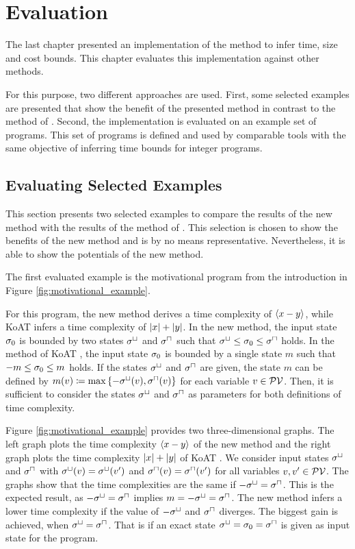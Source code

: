 \chapter{Evaluation}

The last chapter presented an implementation of the method to infer time, size and cost bounds.
This chapter evaluates this implementation against other methods.

For this purpose, two different approaches are used.
First, some selected examples are presented that show the benefit of the presented method in contrast to the method of \cite{koat}.
Second, the implementation is evaluated on an example set of programs.
This set of programs is defined and used by comparable tools with the same objective of inferring time bounds for integer programs.

\section{Evaluating Selected Examples}

This section presents two selected examples to compare the results of the new method with the results of the method of \cite{koat}.
This selection is chosen to show the benefits of the new method and is by no means representative.
Nevertheless, it is able to show the potentials of the new method.

The first evaluated example is the motivational program from the introduction in Figure \ref{fig:motivational_example}.



For this program, the new method derives a time complexity of $\left\langle x-y \right\rangle$, while KoAT \cite{koat} infers a time complexity of $\left|x\right|+\left|y\right|$.
In the new method, the input state $\sigma_0$ is bounded by two states ${\sigma^\sqcup}$ and ${\sigma^\sqcap}$ such that ${\sigma^\sqcup} \leq \sigma_0 \leq {\sigma^\sqcap}$ holds.
In the method of KoAT \cite{koat}, the input state $\sigma_0$ is bounded by a single state $m$ such that $-m \leq \sigma_0 \leq m$ holds.
If the states ${\sigma^\sqcup}$ and ${\sigma^\sqcap}$ are given, the state $m$ can be defined by $m(v) \coloneqq \max \left\lbrace -{\sigma^\sqcup}(v),{\sigma^\sqcap}(v) \right\rbrace$ for each variable $v \in \mathcal{PV}$.
Then, it is sufficient to consider the states ${\sigma^\sqcup}$ and ${\sigma^\sqcap}$ as parameters for both definitions of time complexity.

Figure \ref{fig:motivational_example} provides two three-dimensional graphs.
The left graph plots the time complexity $\left\langle x-y \right\rangle$ of the new method and the right graph plots the time complexity $\left|x\right|+\left|y\right|$ of KoAT \cite{koat}.
We consider input states ${\sigma^\sqcup}$ and ${\sigma^\sqcap}$ with ${\sigma^\sqcup}(v) = {\sigma^\sqcup}(v')$ and ${\sigma^\sqcap}(v) = {\sigma^\sqcap}(v')$ for all variables $v, v' \in \mathcal{PV}$.
The graphs show that the time complexities are the same if $-{\sigma^\sqcup} = {\sigma^\sqcap}$.
This is the expected result, as $-{\sigma^\sqcup} = {\sigma^\sqcap}$ implies $m = -{\sigma^\sqcup} = {\sigma^\sqcap}$.
The new method infers a lower time complexity if the value of $-{\sigma^\sqcup}$ and ${\sigma^\sqcap}$ diverges.
The biggest gain is achieved, when ${\sigma^\sqcup} = {\sigma^\sqcap}$.
That is if an exact state ${\sigma^\sqcup} = \sigma_0 = {\sigma^\sqcap}$ is given as input state for the program.

